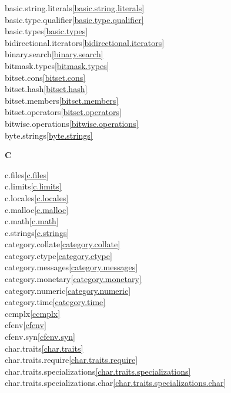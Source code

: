 \begin{multicols}{2}
basic.string.literals\quad\ref{basic.string.literals}\\
basic.type.qualifier\quad\ref{basic.type.qualifier}\\
basic.types\quad\ref{basic.types}\\
bidirectional.iterators\quad\ref{bidirectional.iterators}\\
binary.search\quad\ref{binary.search}\\
bitmask.types\quad\ref{bitmask.types}\\
bitset.cons\quad\ref{bitset.cons}\\
bitset.hash\quad\ref{bitset.hash}\\
bitset.members\quad\ref{bitset.members}\\
bitset.operators\quad\ref{bitset.operators}\\
bitwise.operations\quad\ref{bitwise.operations}\\
byte.strings\quad\ref{byte.strings}\\
\par \textbf{C}\par
c.files\quad\ref{c.files}\\
c.limits\quad\ref{c.limits}\\
c.locales\quad\ref{c.locales}\\
c.malloc\quad\ref{c.malloc}\\
c.math\quad\ref{c.math}\\
c.strings\quad\ref{c.strings}\\
category.collate\quad\ref{category.collate}\\
category.ctype\quad\ref{category.ctype}\\
category.messages\quad\ref{category.messages}\\
category.monetary\quad\ref{category.monetary}\\
category.numeric\quad\ref{category.numeric}\\
category.time\quad\ref{category.time}\\
ccmplx\quad\ref{ccmplx}\\
cfenv\quad\ref{cfenv}\\
cfenv.syn\quad\ref{cfenv.syn}\\
char.traits\quad\ref{char.traits}\\
char.traits.require\quad\ref{char.traits.require}\\
char.traits.specializations\quad\ref{char.traits.specializations}\\
char.traits.specializations.char\quad\ref{char.traits.specializations.char}\\

\end{multicols}

